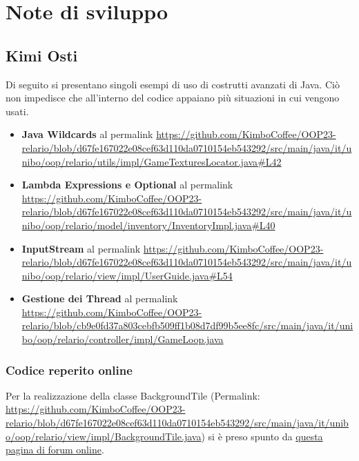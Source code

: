 \documentclass[a4paper,12pt]{report}
\begin{document}
\section{Note di sviluppo}

\subsection{Kimi Osti}

Di seguito si presentano singoli esempi di uso di costrutti avanzati di Java. Ciò non impedisce che all'interno del codice appaiano più situazioni in cui vengono usati.
\begin{itemize}
	\item \textbf{Java Wildcards} al permalink \url{https://github.com/KimboCoffee/OOP23-relario/blob/d67fe167022e08cef63d110da0710154eb543292/src/main/java/it/unibo/oop/relario/utils/impl/GameTexturesLocator.java#L42}
	\item \textbf{Lambda Expressions e Optional} al permalink \url{https://github.com/KimboCoffee/OOP23-relario/blob/d67fe167022e08cef63d110da0710154eb543292/src/main/java/it/unibo/oop/relario/model/inventory/InventoryImpl.java#L40}
	\item \textbf{InputStream} al permalink \url{https://github.com/KimboCoffee/OOP23-relario/blob/d67fe167022e08cef63d110da0710154eb543292/src/main/java/it/unibo/oop/relario/view/impl/UserGuide.java#L54}
	\item \textbf{Gestione dei Thread} al permalink \url{https://github.com/KimboCoffee/OOP23-relario/blob/cb9e0fd37a803cebfb509ff1b08d7df99b5ee8fc/src/main/java/it/unibo/oop/relario/controller/impl/GameLoop.java}
\end{itemize}

\subsubsection{Codice reperito online}
Per la realizzazione della classe BackgroundTile (Permalink:  \url{https://github.com/KimboCoffee/OOP23-relario/blob/d67fe167022e08cef63d110da0710154eb543292/src/main/java/it/unibo/oop/relario/view/impl/BackgroundTile.java}) si è preso spunto da \href{https://coderanch.com/t/336043/java/Images-top}{questa pagina di forum online}.
\end{document}
